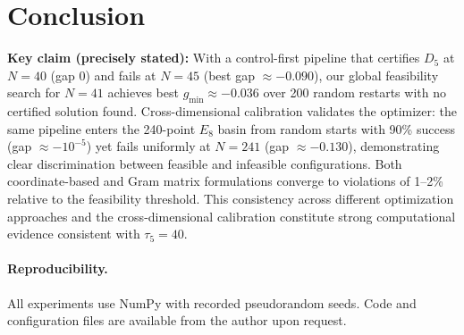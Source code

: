 \documentclass[11pt]{article}
\begin{document}
\section{Conclusion}
\textbf{Key claim (precisely stated):} With a control-first pipeline that certifies $D_5$ at $N=40$ (gap $0$) and fails at $N=45$ (best gap $\approx -0.090$), our global feasibility search for $N=41$ achieves best $g_{\min}\approx -0.036$ over 200 random restarts with no certified solution found.
Cross-dimensional calibration validates the optimizer: the same pipeline enters the 240-point $E_8$ basin from random starts with 90\% success (gap $\approx -10^{-5}$) yet fails uniformly at $N=241$ (gap $\approx -0.130$), demonstrating clear discrimination between feasible and infeasible configurations.
Both coordinate-based and Gram matrix formulations converge to violations of 1--2\% relative to the feasibility threshold. This consistency across different optimization approaches and the cross-dimensional calibration constitute strong computational evidence consistent with $\tau_5=40$.

\paragraph{Reproducibility.}
All experiments use NumPy with recorded pseudorandom seeds. Code and configuration files are available from the author upon request.
\end{document}
